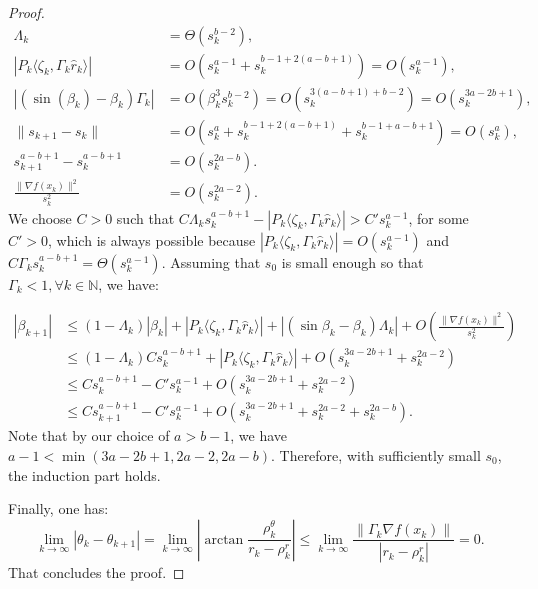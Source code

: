 \documentclass[10pt,a4paper]{amsart}
\newcommand*{\NN}{\mathbb{N}}
\newcommand{\innp}[2]{\langle #1, #2 \rangle}
\begin{document}
\begin{proof}
    \begin{equation*}
        \begin{aligned}
            \Lambda_k &= \Theta(s_k^{b - 2}),\\
            |P_k\innp{\zeta_k}{\Gamma_k\hat{r}_k}| &= O(s_k^{a - 1} + s_k^{b-1 + 2(a-b+1)}) = O(s_k^{a - 1}),\\
            |(\sin(\beta_k) - \beta_k)\Gamma_k| &= O(\beta_k^3s_k^{b - 2}) = O(s_k^{3(a - b + 1) + b - 2}) = O(s_k^{3a -2b + 1}),\\
            \|s_{k+1}-s_k\| &= O(s_k^{a} + s_k^{b - 1 + 2(a - b + 1)} + s_k^{b - 1 + a - b + 1}) = O(s_k^{a}),\\
            s_{k + 1}^{a - b + 1} - s_k^{a - b + 1} &= O(s_k^{2a - b}).\\
            \frac{\|\nabla f(x_k)\|^2}{s_k^2} &= O(s_k^{2a - 2}).
        \end{aligned}
    \end{equation*}
    We choose $C > 0$ such that $C\Lambda_ks_k^{a - b + 1} - |P_k \innp{\zeta_k}{\Gamma_k\hat{r}_k}| > C's_k^{a - 1}$, for some $C' > 0$, which is always possible because $|P_k\innp{\zeta_k}{\Gamma_k\hat{r}_k}| = O(s_{k}^{a - 1})$ and $C\Gamma_ks_k^{a - b + 1} = \Theta(s_{k}^{a - 1})$. Assuming that $s_0$ is small enough so that $\Gamma_k < 1, \forall k \in \NN$, we have:

    \begin{equation*}
        \begin{aligned}
            |\beta_{k+1}| &\leq (1 - \Lambda_k)|\beta_k| + |P_k\innp{\zeta_k}{\Gamma_k\hat{r}_k}| + |(\sin \beta_k - \beta_k)\Lambda_k| + O\left(\frac{\|\nabla f(x_k)\|^2}{s_k^2}\right)\\
            &\leq (1 - \Lambda_k) Cs_k^{a - b + 1} + |P_k\innp{\zeta_k}{\Gamma_k\hat{r}_k}| + O(s_k^{3a - 2b + 1} + s_k^{2a - 2})\\
            &\leq Cs_k^{a - b + 1} - C's_k^{a - 1} + O(s_k^{3a - 2b + 1} + s_k^{2a - 2})\\
            &\leq Cs_{k+1}^{a - b + 1} - C's_k^{a - 1} + O(s_k^{3a - 2b + 1} + s_k^{2a - 2} + s_k^{2a - b}).
        \end{aligned}
    \end{equation*}
    Note that by our choice of $a > b - 1$, we have $a - 1 < \min(3a - 2b + 1, 2a - 2, 2a - b)$. Therefore, with sufficiently small $s_0$, the induction part holds.

    Finally, one has:
    \begin{equation*}
        \lim_{k \to \infty} |\theta_k - \theta_{k + 1}| = \lim_{k \to \infty}\left|\arctan \frac{\rho_k^\theta}{r_k - \rho^r_k}\right| \leq \lim_{k \to \infty} \frac{\|\Gamma_k\nabla f(x_k)\|}{|r_k - \rho^r_k|} = 0.
    \end{equation*}
    That concludes the proof.
\end{proof}
\end{document}
